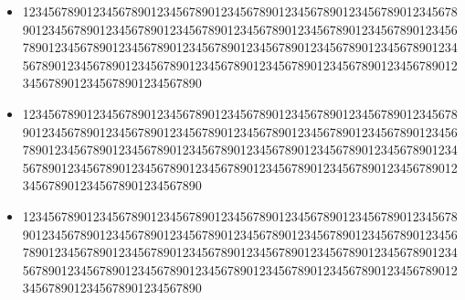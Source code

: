 \documentclass[a4paper,12pt]{article}
\begin{document}
\begin{slide}
\begin{itemize}
    \item 123456789012345678901234567890123456789012345678901234567890123456789012345678901234567890123456789012345678901234567890123456789012345678901234567890123456789012345678901234567890123456789012345678901234567890123456789012345678901234567890123456789012345678901234567890123456789012345678901234567890
    \item 123456789012345678901234567890123456789012345678901234567890123456789012345678901234567890123456789012345678901234567890123456789012345678901234567890123456789012345678901234567890123456789012345678901234567890123456789012345678901234567890123456789012345678901234567890123456789012345678901234567890
    \item 123456789012345678901234567890123456789012345678901234567890123456789012345678901234567890123456789012345678901234567890123456789012345678901234567890123456789012345678901234567890123456789012345678901234567890123456789012345678901234567890123456789012345678901234567890123456789012345678901234567890
    \end{itemize}
    
\end{slide}
\end{document}
